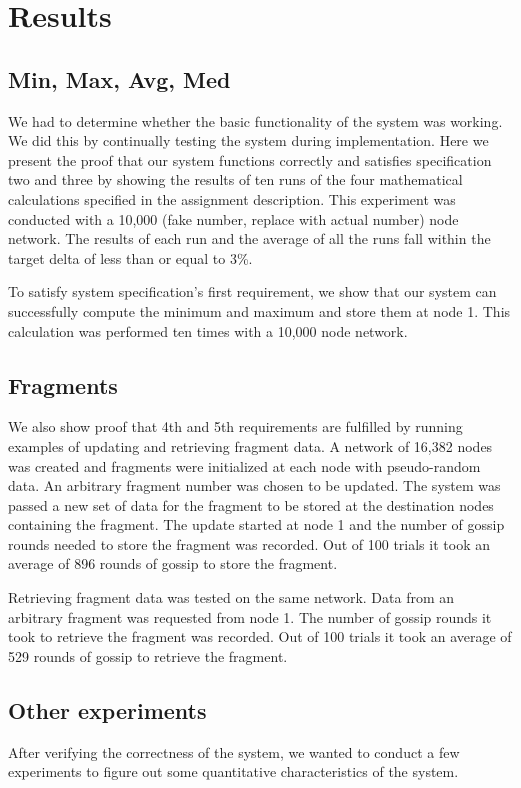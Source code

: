 \section{Results}
\subsection{Min, Max, Avg, Med}
We had to determine whether the basic functionality of the system was working. We did this by continually testing the system during implementation. Here we present the proof that our system functions correctly and satisfies specification two and three by showing the results of ten runs of the four mathematical calculations specified in the assignment description. This experiment was conducted with a 10,000 (fake number, replace with actual number) node network. The results of each run and the average of all the runs fall within the target delta of less than or equal to 3\%.


To satisfy system specification’s first requirement, we show that our system can successfully compute the minimum and maximum and store them at node 1. This calculation was performed ten times with a 10,000 node network.


\subsection{Fragments}
We also show proof that 4th and 5th requirements are fulfilled by running examples of updating and retrieving fragment data. A network of 16,382 nodes was created and fragments were initialized at each node with pseudo-random data. An arbitrary fragment number was chosen to be updated. The system was passed a new set of data for the fragment to be stored at the destination nodes containing the fragment. The update started at node 1 and the number of gossip rounds needed to store the fragment was recorded. Out of 100 trials it took an average of 896 rounds of gossip to store the fragment.

Retrieving fragment data was tested on the same network. Data from an arbitrary fragment was requested from node 1. The number of gossip rounds it took to retrieve the fragment was recorded. Out of 100 trials it took an average of 529 rounds of gossip to retrieve the fragment.

\subsection{Other experiments}
After verifying the correctness of the system, we wanted to conduct a few experiments to figure out some quantitative characteristics of the system.


